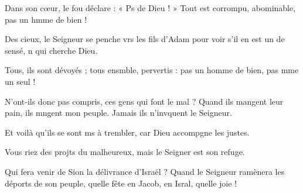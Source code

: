\item Dans son cœur, le fou déclare : « Ps de Dieu ! »\psstar{} Tout est corrompu, abominable, pas un hmme de bien !
\item Des cieux, le Seigneur se penche vrs les fils d’Adam\psstar{} pour voir s’il en est un de sensé, n qui cherche Dieu.
\item Tous, ils sont dévoyés ; tous ensmble, pervertis :\psstar{} pas un homme de bien, pas mme un seul !
\item N’ont-ils donc pas compris, ces gens qui font le mal ?\pscross{} Quand ils mangent leur pain, ils mngent mon peuple.\psstar{} Jamais ils n’invquent le Seigneur.
\item Et voilà qu’ils se sont ms à trembler,\psstar{} car Dieu accompgne les justes.
\item Vous riez des projts du malheureux,\psstar{} mais le Seigner est son refuge.
\item Qui fera venir de Sion la délivrance d’Israël ?\pscross{} Quand le Seigneur ramènera les déports de son peuple,\psstar{} quelle fête en Jacob, en Isral, quelle joie !